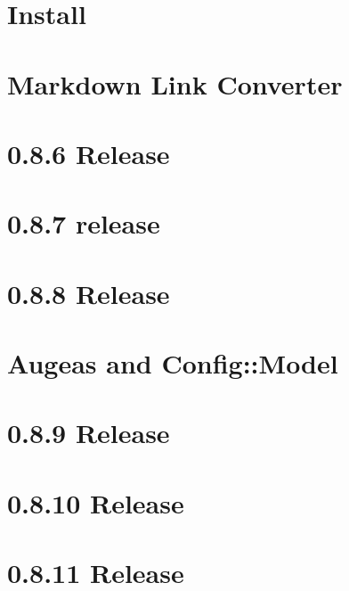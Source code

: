 \documentclass[twoside]{book}
\newcommand{\+}{\discretionary{\mbox{\scriptsize$\hookleftarrow$}}{}{}}
\begin{document}
\chapter{Install}
\label{doc_INSTALL_md}

\chapter{Markdown Link Converter}
\label{doc_markdownlinkconverter_README_md}

\chapter{0.8.6 Release}
\label{doc_news_2014-06-21_0_8_6_md}

\chapter{0.8.7 release}
\label{doc_news_2014-07-28_0_8_7_md}

\chapter{0.8.8 Release}
\label{doc_news_2014-09-02_0_8_8_md}

\chapter{Augeas and Config\+:\+:Model}
\label{doc_news_2014-10-22_augeas_md}

\chapter{0.8.9 Release}
\label{doc_news_2014-11-04_0_8_9_md}

\chapter{0.8.10 Release}
\label{doc_news_2014-12-02_0_8_10_md}

\chapter{0.8.11 Release}
\label{doc_news_2015-04-03_0_8_11_md}

\end{document}
